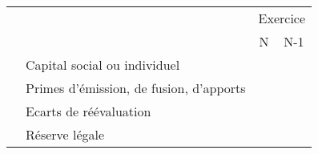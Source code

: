 

\begin{table}[h]
\renewcommand{\arraystretch}{1.2}
\footnotesize
\centering
\begin{tabular}{|l|p{6cm}|c|c|}
\cline{3-4}
                                                                                \multicolumn{2}{c|}{}                                                                  &  \multicolumn{2}{c|}{Exercice} \\
\cline{3-4}                                                                                                                                                           
                                                                                \multicolumn{2}{c|}{}                         				                          &   {\scriptsize \phantom{-}N\phantom{1}} & {\scriptsize N-1} \\
\hline                                                                                                                                                                
\parbox[t]{2mm}{} &  Capital social ou individuel                                               &     &   \\ 
                                                                                              &  Primes d'émission, de fusion, d'apports                                           &     &   \\ 
                                                                                              &  Ecarts de réévaluation                                        &     &   \\ 
                                                                                              &  Réserve légale                                              &     &   \\ 

\end{tabular}
\end{table}
